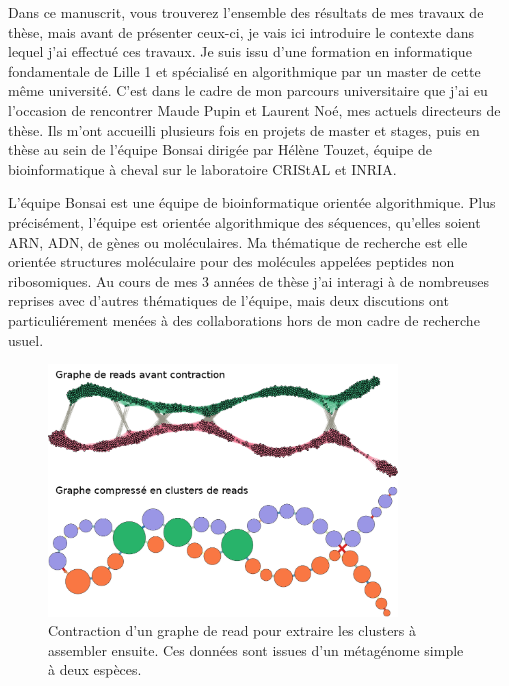 Dans ce manuscrit, vous trouverez l'ensemble des résultats de mes travaux de thèse, mais avant de présenter ceux-ci, je vais ici introduire le contexte dans lequel j'ai effectué ces travaux.
Je suis issu d'une formation en informatique fondamentale de Lille 1 et spécialisé en algorithmique par un master de cette même université.
C'est dans le cadre de mon parcours universitaire que j'ai eu l'occasion de rencontrer Maude Pupin et Laurent Noé, mes actuels directeurs de thèse.
Ils m'ont accueilli plusieurs fois en projets de master et stages, puis en thèse au sein de l'équipe Bonsai dirigée par Hélène Touzet, équipe de bioinformatique à cheval sur le laboratoire CRIStAL et INRIA.

L'équipe Bonsai est une équipe de bioinformatique orientée algorithmique.
Plus précisément, l'équipe est orientée algorithmique des séquences, qu'elles soient ARN, ADN, de gènes ou moléculaires.
Ma thématique de recherche est elle orientée structures moléculaire pour des molécules appelées peptides non ribosomiques.
Au cours de mes 3 années de thèse j'ai interagi à de nombreuses reprises avec d'autres thématiques de l'équipe, mais deux discutions ont particuliérement menées à des collaborations hors de mon cadre de recherche usuel.

\begin{figure}[!ht]
  \begin{center}
    \includegraphics[width=350px]{Figures/preambule/pierre.png}
    \caption{\label{pierre}Contraction d'un graphe de read pour extraire les clusters à assembler ensuite.
    Ces données sont issues d'un métagénome simple à deux espèces.}
  \end{center}
\end{figure}

